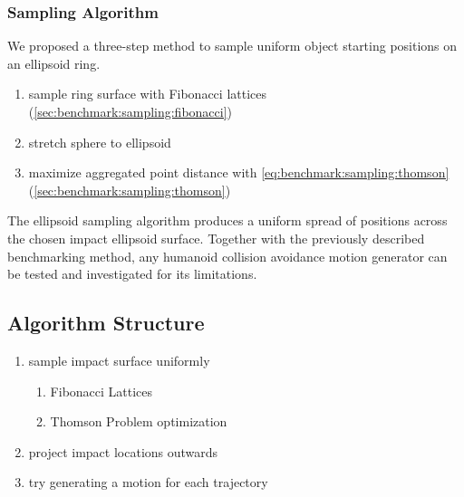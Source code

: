 \subsubsection{Sampling Algorithm} \label{sec:benchmark:sampling:algo}
We proposed a three-step method to sample uniform object starting positions on an ellipsoid ring.
\begin{enumerate}
\item sample ring surface with Fibonacci lattices (\cref{sec:benchmark:sampling:fibonacci})
\item stretch sphere to ellipsoid
\item maximize aggregated point distance with \cref{eq:benchmark:sampling:thomson} (\cref{sec:benchmark:sampling:thomson})
\end{enumerate}
The ellipsoid sampling algorithm produces a uniform spread of positions across the chosen impact ellipsoid surface.
Together with the previously described benchmarking method, any humanoid collision avoidance motion generator can be tested and investigated for its limitations. \\



\subsection{Algorithm Structure}
\begin{enumerate}
  \item sample impact surface uniformly
  \begin{enumerate}
    \item Fibonacci Lattices \
    \item Thomson Problem optimization
  \end{enumerate}
  \item project impact locations outwards
  \item try generating a motion for each trajectory
\end{enumerate}


